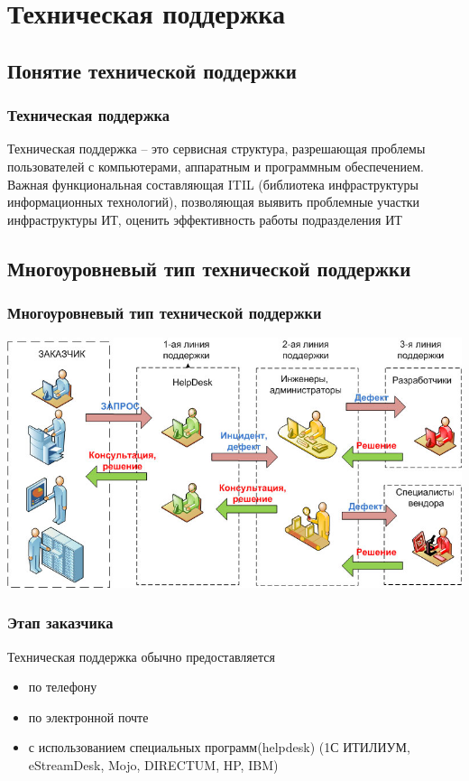 \documentclass{../industrial-development}
\begin{document}
\lecturenotes


\section{Техническая поддержка}

\subsection{Понятие технической поддержки}

\begin{frame} \frametitle{Техническая поддержка}
	\begin{definition} 
		\alert {Техническая поддержка} -- это сервисная структура, разрешающая проблемы пользователей с компьютерами, аппаратным и программным обеспечением. Важная функциональная составляющая ITIL (библиотека инфраструктуры информационных технологий), позволяющая выявить проблемные участки инфраструктуры ИТ, оценить эффективность работы подразделения ИТ
	\end{definition}
\end{frame}
\lecturenotes

\subsection{Многоуровневый тип технической поддержки}
\begin{frame} \frametitle{Многоуровневый тип технической поддержки}
    \centerline{\includegraphics[width=\textwidth]{structure.jpg}}
\end{frame}

\lecturenotes

\begin{frame} \frametitle{Этап заказчика}

Техническая поддержка обычно предоставляется 
	\begin{itemize}
        \item по телефону
        \item по электронной почте
        \item с использованием специальных программ(helpdesk) (1С ИТИЛИУМ, eStreamDesk, Mojo, DIRECTUM, HP, IBM)
	\end{itemize}
\end{frame}
\end{document}
